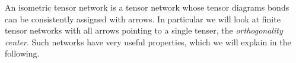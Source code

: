 An isometric tensor network is a tensor network whose tensor diagrams bonds can be consistently assigned with arrows. In particular we will look at finite tensor networks with all arrows pointing to a single tenser, the \textit{orthogonality center}. Such networks have very useful properties, which we will explain in the following.